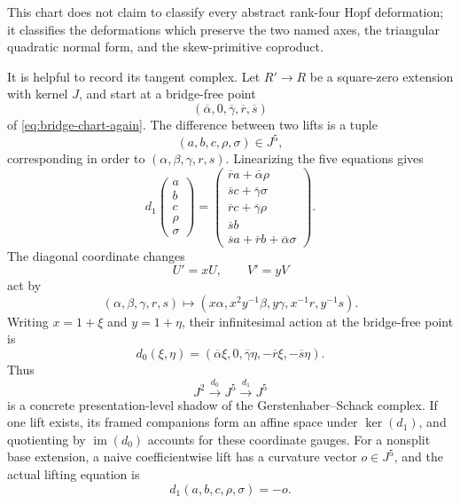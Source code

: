 \documentclass[11pt]{amsart}
\theoremstyle{definition}
\theoremstyle{remark}
\begin{document}
This chart does not claim to classify every abstract rank-four Hopf
deformation; it classifies the deformations which preserve the two named
axes, the triangular quadratic normal form, and the skew-primitive
coproduct.

It is helpful to record its tangent complex.  Let \(R'\to R\) be a
square-zero extension with kernel \(J\), and start at a bridge-free point
\[
 (\overline\alpha,0,\overline\gamma,\overline r,\overline s)
\]
of \eqref{eq:bridge-chart-again}.  The difference between two lifts is a
tuple
\[
 (a,b,c,\rho,\sigma)\in J^5,
\]
corresponding in order to
\((\alpha,\beta,\gamma,r,s)\).  Linearizing the five equations gives
\begin{equation}\label{eq:explicit-deformation-d1}
 d_1
 \begin{pmatrix}a\\ b\\ c\\ \rho\\ \sigma\end{pmatrix}
 =
 \begin{pmatrix}
  \overline r a+\overline\alpha\rho\\
  \overline s c+\overline\gamma\sigma\\
  \overline r c+\overline\gamma\rho\\
  \overline s b\\
  \overline s a+\overline r b+\overline\alpha\sigma
 \end{pmatrix}.
\end{equation}
The diagonal coordinate changes
\[
 U'=xU,\qquad V'=yV
\]
act by
\[
 (\alpha,\beta,\gamma,r,s)\longmapsto
 (x\alpha,x^2y^{-1}\beta,y\gamma,x^{-1}r,y^{-1}s).
\]
Writing \(x=1+\xi\) and \(y=1+\eta\), their infinitesimal action at the
bridge-free point is
\begin{equation}\label{eq:explicit-deformation-d0}
 d_0(\xi,\eta)=
 (\overline\alpha\xi,0,\overline\gamma\eta,
  -\overline r\xi,-\overline s\eta).
\end{equation}
Thus
\[
 J^2\xrightarrow{\ d_0\ }J^5\xrightarrow{\ d_1\ }J^5
\]
is a concrete presentation-level shadow of the
Gerstenhaber--Schack complex.  If one lift exists, its framed companions
form an affine space under \(\ker(d_1)\), and quotienting by
\(\operatorname{im}(d_0)\) accounts for these coordinate gauges.
For a nonsplit base extension, a naive coefficientwise lift has a
curvature vector \(o\in J^5\), and the actual lifting equation is
\[
 d_1(a,b,c,\rho,\sigma)=-o.
\]
\end{document}
